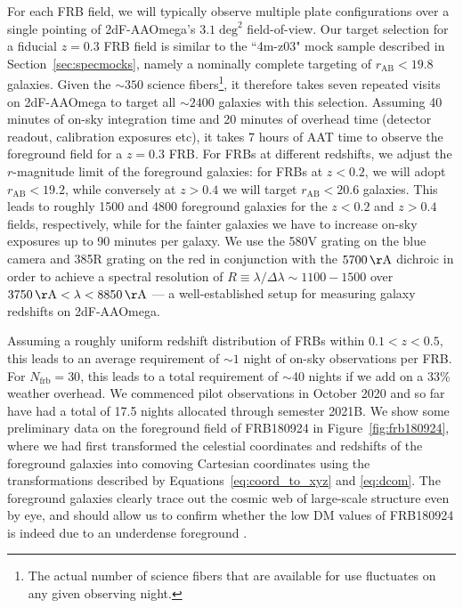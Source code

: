 \documentclass[twocolumn]{aastex63}
\newcommand{\nfrb}{\ensuremath{N_\mathrm{frb}}}
\begin{document}
\begin{CJK*}{UTF8}{gbsn}
For each FRB field, we will typically observe multiple plate configurations over a single pointing of 2dF-AAOmega's $3.1\;\mathrm{deg}^2$ 
field-of-view. Our target selection for a fiducial $z=0.3$ FRB field is similar to the ``4m-z03" mock sample described in Section~\ref{sec:specmocks},
namely a nominally complete targeting of $r_\mathrm{AB} < 19.8$ galaxies. Given the $\sim 350$ science fibers\footnote{The actual number of science fibers that are available for use fluctuates on any given observing night.}, it therefore takes seven repeated visits
on 2dF-AAOmega to target all $\sim 2400$ galaxies with this selection. Assuming 40 minutes of on-sky integration time and 20 minutes
of overhead time (detector readout, calibration exposures etc), it takes 7 hours of AAT time to observe the foreground field for a $z=0.3$ FRB. For FRBs at different redshifts, we adjust the $r$-magnitude limit of the foreground galaxies: for FRBs at $z<0.2$, we will adopt 
$r_\mathrm{AB}<19.2$, while conversely at $z>0.4$ we will target $r_\mathrm{AB}<20.6$ galaxies. This leads to roughly 1500
and 4800 foreground galaxies for the $z<0.2$ and $z>0.4$ fields, respectively, while for the fainter galaxies we have to 
increase on-sky exposures up to 90 minutes per galaxy. We use the 580V grating on the blue camera and 
385R grating on the red in conjunction with the $5700\,\mathrm{\AA}$
 dichroic in order to achieve a spectral resolution of $R \equiv \lambda/\Delta \lambda \sim 1100-1500$
over $3750\,\mathrm{\AA} <\lambda <8850\,\mathrm{\AA}$ --- a well-established setup for measuring galaxy redshifts on 2dF-AAOmega.

Assuming a roughly uniform redshift distribution of FRBs within $0.1<z<0.5$, this leads to an average requirement of $\sim 1$ night 
of on-sky observations per FRB. For $\nfrb = 30$, this leads to a total requirement of $\sim$40 nights if we add on a 33\% weather overhead. We commenced pilot observations in October 2020 and so far have had a total of 17.5 nights allocated through semester 2021B. 
We show some preliminary data on the foreground field of FRB180924 in Figure~\ref{fig:frb180924}, where we had first
transformed the celestial coordinates and redshifts of the foreground galaxies into comoving Cartesian coordinates using the transformations
described by Equations~\ref{eq:coord_to_xyz} and \ref{eq:dcom}. The foreground galaxies clearly trace out the cosmic web 
of large-scale structure even by eye, and should allow us to confirm whether the low DM values of FRB180924 is indeed
due to an underdense foreground \citep{simha:2021}. %



\end{CJK*}
\end{document}
